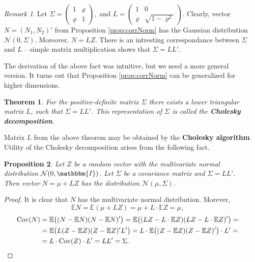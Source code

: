 \documentclass[a4paper,11pt, twoside]{book}
\newtheorem{thm}{Theorem}[chapter]
\newtheorem{prop}[thm]{Proposition}
\theoremstyle{definition}
\theoremstyle{remark}
\newtheorem{remark}{Remark}[chapter]
\def\E{{\mathbb{E}}}
\def\Cov{{\hbox{Cov}}}
\begin{document}
\begin{remark}
 Let $\Sigma = \left( \begin{array}{cc}
                    1    & \varrho \\
                    \varrho & 1
                    \end{array} \right),$
  and $L = \left( \begin{array}{cc}
                    1    & 0 \\
                    \varrho & \sqrt{1 - \varrho^2}
                    \end{array} \right).$
 Clearly, vector $N = (N_1, N_2)'$ from Proposition \ref{prop:corrNorm} has the Gaussian distribution $\mathcal{N}(0, \Sigma)$. Moreover, $N = LZ$. There is an intresting correspondance between $\Sigma$ and $L$ -- simple matrix multiplication shows that $\Sigma = LL'$.  
\end{remark}

The derivation of the above fact was intuitive, but we need a more general version. It turns out that Proposition \ref{prop:corrNorm} can be generalized for higher dimensions.
\begin{thm}
 For the positive-definite matrix $\Sigma$ there exists a lower triangular matrix $L$, such that $\Sigma = LL'$. This representation of $\Sigma$ is called the \textbf{Cholesky decomposition}.
\end{thm}
Matrix $L$ from the above theorem may be obtained by the \textbf{Cholesky algorithm}. Utility of the Cholesky decomposition arises from the following fact.
\begin{prop}
 Let $Z$ be a random vector with the multivariate normal distribution $\mathcal{N}(0, \mathbbm{I})$. Let $\Sigma$ be a covariance matrix and $\Sigma = LL'$. Then vector $N = \mu + LZ$ has the distribution $\mathcal{N}(\mu, \Sigma)$.
\end{prop}
\begin{proof}
 It is clear that $N$ has the multivariate normal distribution. Morever,
 \[ \E N = \E(\mu + LZ) = \mu + L\cdot\E Z = \mu, \]
 \begin{equation*}
  \begin{split}
 \Cov(N) &= \E \bigl( (N - \E N) (N - \E N)' \bigr) = \E \bigl( (LZ - L\cdot \E Z) (LZ - L\cdot \E Z)' \bigr) =\\
         &= \E \bigl( L(Z - \E Z) (Z - \E Z)'L' \bigr) = L\cdot \E \bigl( (Z - \E Z) (Z - \E Z)' \bigr) \cdot L' =\\
         &= L\cdot \Cov(Z) \cdot L'= LL' = \Sigma.   
  \end{split}
 \end{equation*}
\end{proof}
\end{document}
